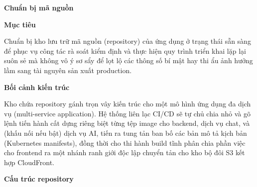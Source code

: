 \vspace{0.5em}\noindent\textbf{Chuẩn bị mã nguồn}\par

\vspace{0.5em}\noindent\textbf{Mục tiêu}\par

Chuẩn bị kho lưu trữ mã nguồn (repository) của ứng dụng ở trạng thái sẵn
sàng để phục vụ công tác rà soát kiểm định và thực hiện quy trình triển
khai lặp lại suôn sẻ mà không vô ý sơ sẩy để lọt lộ các thông số bí mật
hay thi ẩu ảnh hưởng lầm sang tài nguyên sản xuất production.

\vspace{0.5em}\noindent\textbf{Bối cảnh kiến
trúc}\par

Kho chứa repository gánh trọn vây kiến trúc cho một mô hình ứng dụng đa
dịch vụ (multi-service application). Hệ thống liên lạc CI/CD sẽ tự chủ
chia nhỏ và gõ lệnh tiến hành cất dựng riêng biệt từng tệp image cho
backend, dịch vụ chat, và (khấu nối nếu bật) dịch vụ AI, tiến ra tung
tản ban bố các bản mô tả kịch bản (Kubernetes manifests), đồng thời cho
thi hành build tĩnh phân chia phần việc cho frontend ra một nhánh ranh
giới độc lập chuyển tản cho kho bộ đôi S3 kết hợp CloudFront.

\vspace{0.5em}\noindent\textbf{Cấu trúc repository}\par

